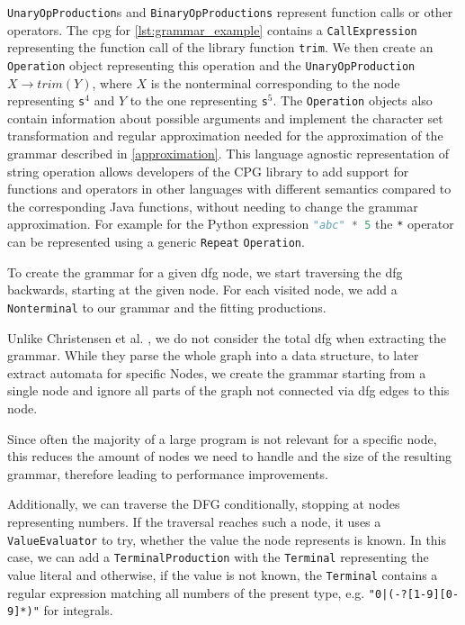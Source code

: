 \lstinline|UnaryOpProduction|s and \lstinline|BinaryOpProductions| represent function calls or other operators. The \ac{cpg} for \ref{lst:grammar_example} contains a \lstinline|CallExpression| representing the function call of the library function \lstinline|trim|. We then create an \lstinline|Operation| object representing this operation and the \lstinline|UnaryOpProduction| $X \rightarrow trim(Y)$, where $X$ is the nonterminal corresponding to the node representing \lstinline|s|$^4$ and $Y$ to the one representing \lstinline|s|$^5$. The \lstinline|Operation| objects also contain information about possible arguments and implement the character set transformation and regular approximation needed for the approximation of the grammar described in \ref{approximation}. This language agnostic representation of string operation allows developers of the \ac{CPG} library to add support for functions and operators in other languages with different semantics compared to the corresponding Java functions, without needing to change the grammar approximation. For example for the Python expression \lstinline[language=Python]|"abc" * 5| the \lstinline|*| operator can be represented using a generic \lstinline|Repeat| \lstinline|Operation|.

To create the grammar for a given \ac{dfg} node, we start traversing the \ac{dfg} backwards, starting at the given node. For each visited node, we add a \lstinline|Nonterminal| to our grammar and the fitting productions.

Unlike Christensen et al. \cite{brics}, we do not consider the total \ac{dfg} when extracting the grammar. While they parse the whole graph into a data structure, to later extract automata for specific Nodes, we create the grammar starting from a single node and ignore all parts of the graph not connected via \ac{dfg} edges to this node.

Since often the majority of a large program is not relevant for a specific node, this reduces the amount of nodes we need to handle and the size of the resulting grammar, therefore leading to performance improvements.

Additionally, we can traverse the \ac{DFG} conditionally, stopping at nodes representing numbers. If the traversal reaches such a node, it uses a \lstinline|ValueEvaluator| to try, whether the value the node represents is known. In this case, we can add a \lstinline|TerminalProduction| with the \lstinline|Terminal| representing the value literal and otherwise, if the value is not known, the \lstinline|Terminal| contains a regular expression matching all numbers of the present type, e.g. \lstinline{"0|(-?[1-9][0-9]*)"} for integrals.
	

